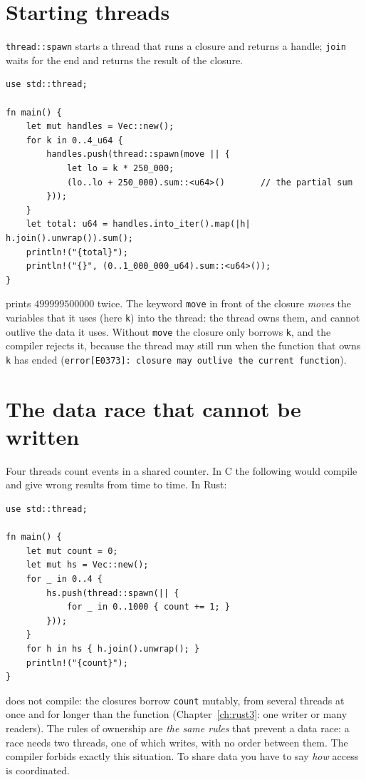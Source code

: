 \section*{Starting threads}
\verb!thread::spawn! starts a thread that runs a closure and returns a handle; \verb!join! waits for the end and returns the result of the closure.
\begin{verbatim}
use std::thread;

fn main() {
    let mut handles = Vec::new();
    for k in 0..4_u64 {
        handles.push(thread::spawn(move || {
            let lo = k * 250_000;
            (lo..lo + 250_000).sum::<u64>()       // the partial sum
        }));
    }
    let total: u64 = handles.into_iter().map(|h| h.join().unwrap()).sum();
    println!("{total}");
    println!("{}", (0..1_000_000_u64).sum::<u64>());
}
\end{verbatim}
prints $499999500000$ twice. The keyword \verb!move! in front of the closure \emph{moves} the variables that it uses (here \verb!k!) into the thread: the thread owns them, and cannot outlive the data it uses. Without \verb!move! the closure only borrows \verb!k!, and the compiler rejects it, because the thread may still run when the function that owns \verb!k! has ended (\verb!error[E0373]: closure may outlive the current function!).

\section*{The data race that cannot be written}
Four threads count events in a shared counter. In C the following would compile and give wrong results from time to time. In Rust:
\begin{verbatim}
use std::thread;

fn main() {
    let mut count = 0;
    let mut hs = Vec::new();
    for _ in 0..4 {
        hs.push(thread::spawn(|| {
            for _ in 0..1000 { count += 1; }
        }));
    }
    for h in hs { h.join().unwrap(); }
    println!("{count}");
}
\end{verbatim}
does not compile: the closures borrow \verb!count! mutably, from several threads at once and for longer than the function (Chapter~\ref{ch:rust3}: one writer or many readers). The rules of ownership are \emph{the same rules} that prevent a data race: a race needs two threads, one of which writes, with no order between them. The compiler forbids exactly this situation. To share data you have to say \emph{how} access is coordinated.

